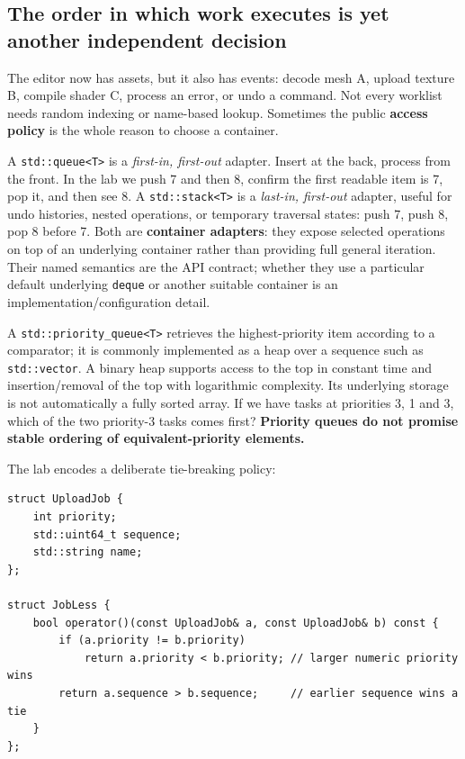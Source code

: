 \subsection{The order in which work executes is yet another independent decision}\label{01-foundations-i-ch006-the-order-in-which-work-executes-is-yet-another-independent-decision}

The editor now has assets, but it also has events: decode mesh A, upload texture B, compile shader C, process an error, or undo a command. Not every worklist needs random indexing or name-based lookup. Sometimes the public \textbf{access policy} is the whole reason to choose a container.

A \texttt{std::queue\textless{}T\textgreater{}} is a \emph{first-in, first-out} adapter. Insert at the back, process from the front. In the lab we push 7 and then 8, confirm the first readable item is 7, pop it, and then see 8. A \texttt{std::stack\textless{}T\textgreater{}} is a \emph{last-in, first-out} adapter, useful for undo histories, nested operations, or temporary traversal states: push 7, push 8, pop 8 before 7. Both are \textbf{container adapters}: they expose selected operations on top of an underlying container rather than providing full general iteration. Their named semantics are the API contract; whether they use a particular default underlying \texttt{deque} or another suitable container is an implementation/configuration detail.

A \texttt{std::priority\_queue\textless{}T\textgreater{}} retrieves the highest-priority item according to a comparator; it is commonly implemented as a heap over a sequence such as \texttt{std::vector}. A binary heap supports access to the top in constant time and insertion/removal of the top with logarithmic complexity. Its underlying storage is not automatically a fully sorted array. If we have tasks at priorities 3, 1 and 3, which of the two priority-3 tasks comes first? \textbf{Priority queues do not promise stable ordering of equivalent-priority elements.}

The lab encodes a deliberate tie-breaking policy:

\begin{verbatim}
struct UploadJob {
    int priority;
    std::uint64_t sequence;
    std::string name;
};

struct JobLess {
    bool operator()(const UploadJob& a, const UploadJob& b) const {
        if (a.priority != b.priority)
            return a.priority < b.priority; // larger numeric priority wins
        return a.sequence > b.sequence;     // earlier sequence wins a tie
    }
};
\end{verbatim}

